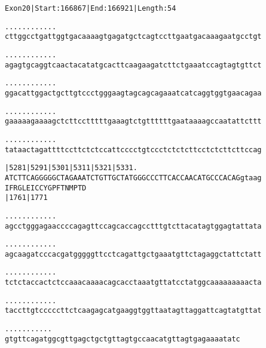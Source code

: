 \documentclass{article}
\begin{document}
\begin{alltt}
Exon 20 | Start: 166867 | End: 166921 | Length: 54

.    .    .    .    .    .    .    .    .    .    .    .    
cttggcctgattggtgacaaaagtgagatgctcagtccttgaatgacaaagaatgcctgt

.    .    .    .    .    .    .    .    .    .    .    .    
agagtgcaggtcaactacatatgcacttcaagaagatcttctgaaatccagtagtgttct

.    .    .    .    .    .    .    .    .    .    .    .    
ggacattggactgcttgtccctgggaagtagcagcagaaatcatcaggtggtgaacagaa

.    .    .    .    .    .    .    .    .    .    .    .    
gaaaaagaaaagctcttcctttttgaaagtctgttttttgaataaaagccaatattcttt

.    .    .    .    .    .    .    .    .    .    .    .    
tataactagattttccttctctccattcccctgtccctctctcttcctctcttcttccag

   |5281     |5291     |5301     |5311     |5321     |5331 .
ATCTTCAGGGGGCTAGAAATCTGTTGCTATGGGCCCTTCACCAACATGCCCACAGgtaag
I  F  R  G  L  E  I  C  C  Y  G  P  F  T  N  M  P  T  D     
   |1761                         |1771                      

    .    .    .    .    .    .    .    .    .    .    .    .
agcctgggagaaccccagagttccagcaccagcctttgtcttacatagtggagtattata

    .    .    .    .    .    .    .    .    .    .    .    .
agcaagatcccacgatgggggttcctcagattgctgaaatgttctagaggctattctatt

    .    .    .    .    .    .    .    .    .    .    .    .
tctctaccactctccaaacaaaacagcacctaaatgttatcctatggcaaaaaaaaacta

    .    .    .    .    .    .    .    .    .    .    .    .
taccttgtcccccttctcaagagcatgaaggtggttaatagttaggattcagtatgttat

    .    .    .    .    .    .    .    .    .    .    .
gtgttcagatggcgttgagctgctgttagtgccaacatgttagtgagaaaatatc
\end{alltt}
\newpage
\end{document}
